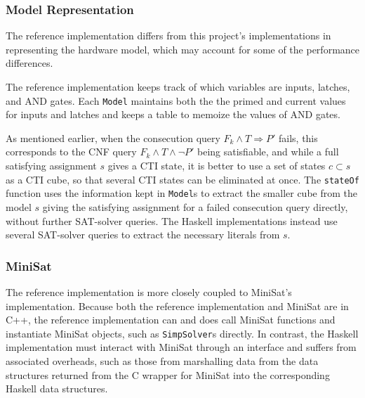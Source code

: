 \documentclass[12pt,a4paper,twoside,openright]{report}
\begin{document}
{\subsubsection{Model Representation}
The reference implementation differs from this project's implementations in representing the hardware model,
which may account for some of the performance differences.

The reference implementation keeps track of which variables are inputs, latches, and AND gates.
Each \verb,Model, maintains both the the primed and current values for inputs and latches and keeps a
table to memoize the values of AND gates.


As mentioned earlier, when the consecution query $F_k \wedge T \Rightarrow P'$ fails, this corresponds
to the CNF query $F_k \wedge T \wedge \neg P'$ being satisfiable, and while a full satisfying assignment
$s$ gives a CTI state, it is better to use a set of states $c \subset s$ as a CTI cube, so that several
CTI states can be eliminated at once.
The \verb,stateOf, function uses the information kept in \verb,Model,s to extract the smaller
cube from the model $s$ giving the satisfying assignment for a failed consecution query directly,
without further SAT-solver queries.
The Haskell implementations instead use several SAT-solver queries to extract the necessary literals
from $s$.

\subsubsection{MiniSat}
The reference implementation is more closely coupled to MiniSat's implementation. Because both the reference
implementation and MiniSat are in C++, the reference implementation can and does call MiniSat functions
and instantiate MiniSat objects, such as \verb,SimpSolver,s directly. In contrast, the Haskell implementation
must interact with MiniSat through an interface and suffers from associated overheads, such as those from
marshalling data from the data structures returned from the C wrapper for MiniSat into the corresponding
Haskell data structures.

}
\end{document}
